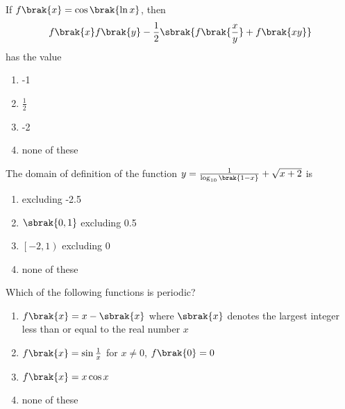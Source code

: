 %

\iffalse
\title{10/A/C/5-19}
\author{EE24BTECH11040 - Mandara Hosur}
\section{mcq-single}
\fi


\item If $f\brak{x} = \cos{\brak{\ln{x}}}$, then $$f\brak{x}f\brak{y}-\frac{1}{2} \sbrak{f\brak{\frac{x}{y}}+f\brak{xy}}$$ has the value
\hfill{}
\begin{multicols}{2}
	\begin{enumerate}
		\item -1 
		\item $\frac{1}{2}$
		\item -2 
		\item none of these
	\end{enumerate}
\end{multicols}

\item The domain of definition of the function
$y = \frac{1}{\log_{10}{\brak{1-x}}} + \sqrt{x+2}$ is
\hfill{}
\begin{multicols}{2}
	\begin{enumerate}
		\item {} excluding -2.5 
		\item $\sbrak{0, 1}$ excluding 0.5
		\item $\left[-2, 1\right)$ excluding 0 
		\item none of these
	\end{enumerate}
\end{multicols}

\item Which of the following functions is periodic?
\hfill{}
\begin{enumerate}
\item $f\brak{x}=x-\sbrak{x}$ where $\sbrak{x}$ denotes the largest integer less than or equal to the real number $x$
\item $f\brak{x}=\sin{\frac{1}{x}}$ for $x\neq0$, $f\brak{0}=0$
\item $f\brak{x}=x\cos{x}$
\item none of these
\end{enumerate}

